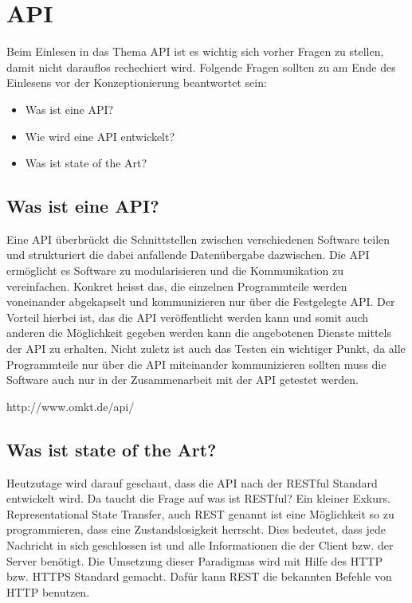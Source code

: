 \section{API}
Beim Einlesen in das Thema API ist es wichtig sich vorher Fragen zu stellen, damit nicht darauflos rechechiert wird. Folgende Fragen sollten zu am Ende des Einlesens vor der Konzeptionierung beantwortet sein:
\begin{itemize}
\item Was ist eine API?
\item Wie wird eine API entwickelt?
\item Was ist state of the Art?
\end{itemize}

\subsection{Was ist eine API?}
Eine API überbrückt die Schnittstellen zwischen verschiedenen Software teilen und strukturiert die dabei anfallende Datenübergabe dazwischen. Die API ermöglicht es Software zu modularisieren und die Kommunikation zu vereinfachen. Konkret heisst das, die einzelnen Programmteile werden voneinander abgekapselt und kommunizieren nur über die Festgelegte API. Der Vorteil hierbei ist, das die API veröffentlicht werden kann und somit auch anderen die Möglichkeit gegeben werden kann die angebotenen Dienste mittels der API zu erhalten. Nicht zuletz ist auch das Testen ein wichtiger Punkt, da alle Programmteile nur über die API miteinander kommunizieren sollten muss die Software auch nur in der Zusammenarbeit mit der API getestet werden. 

http://www.omkt.de/api/

\subsection{Was ist state of the Art?}
Heutzutage wird darauf geschaut, dass die API nach der RESTful Standard entwickelt wird. Da taucht die Frage auf was ist RESTful? Ein kleiner Exkurs. Representational State Transfer, auch REST genannt ist eine Möglichkeit so zu programmieren, dass eine Zustandslosigkeit herrscht. Dies bedeutet, dass jede Nachricht in sich geschlossen ist und alle Informationen die der Client bzw. der Server benötigt. Die Umsetzung dieser Paradigmas wird mit Hilfe des HTTP bzw. HTTPS Standard gemacht. Dafür kann REST die bekannten Befehle von HTTP benutzen.\\

